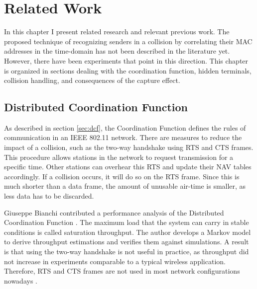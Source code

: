 
\chapter{Related Work}\label{ch:relatedwork}
\glsresetall %

In this chapter I present related research and relevant previous work. The proposed technique of recognizing senders in a collision by correlating their MAC addresses in the time-domain has not been described in the literature yet. However, there have been experiments that point in this direction. This chapter is organized in sections dealing with the coordination function, hidden terminals, collision handling, and consequences of the capture effect.



\section{Distributed Coordination Function}\label{sec:related-dcf}

As described in section \ref{sec:dcf}, the Coordination Function defines the rules of communication in an IEEE 802.11 network. There are measures to reduce the impact of a collision, such as the two-way handshake using \gls{RTS} and \gls{CTS} frames. This procedure allows stations in the network to request transmission for a specific time. Other stations can overhear this \gls{RTS} and update their \gls{NAV} tables accordingly. If a collision occurs, it will do so on the \gls{RTS} frame. Since this is much shorter than a data frame, the amount of unusable air-time is smaller, as less data has to be discarded.

Giuseppe Bianchi contributed a performance analysis of the Distributed Coordination Function \cite{bianchi2000}. The maximum load that the system can carry in stable conditions is called saturation throughput. The author develops a Markov model to derive throughput estimations and verifies them against simulations. A result is that using the two-way handshake is not useful in practice, as throughput did not increase in experiments comparable to a  typical wireless application. Therefore, \gls{RTS} and \gls{CTS} frames are not used in most network configurations nowadays \cite{bianchi2000, gollakota2008, choi2013}.\\

